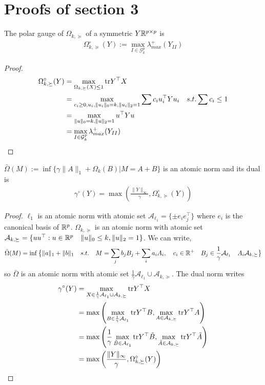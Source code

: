 \documentclass{article}
\begin{document}
\section{Proofs of section 3}

\begin{lemma} The polar gauge of $\Omega_{k,\succeq}$ of a symmetric $Y\mathbb{R}^{p\times p}$ is
\begin{align}
\Omega_{k,\succeq}^{\circ}(Y):= \max_{I\in\mathcal{G}^p_k}\lambda^{+}_{max}(Y_{II})
\end{align}
\end{lemma}

\begin{proof}
\begin{align}
\Omega_{k,\succeq}^{\circ}(Y) 
&=\max_{\Omega_{k,\succeq}(X)\leq 1} {\rm tr}{Y^{\top}X}\\
&=\max_{c_i\geq 0, u_{i}, \|u_{i}\|_0=k, \|u_{i}\|_ 2=1 } \sum c_i u_{i}^{\top}Yu_{i} \quad s.t.  \sum c_i\leq 1\\
&=\max_{\|u\|_0=k, \|u\|_ 2=1 } u^{\top}Yu \\
&=\max_{I\in\mathcal{G}^p_k}\lambda^{+}_{max}(Y_{II})
\end{align}
\end{proof}

\begin{lemma} $\bar{\Omega}(M):=\inf\{\gamma\|A\|_{1}+\Omega_k(B)|M=A+B\}$ is an atomic norm and its dual is 
\begin{align*}
\gamma^{\circ}(Y)=\max\left(\frac{\|Y\|_{\infty}}{\gamma},\Omega_{k,\succeq}^{\circ}(Y)\right)
\end{align*}
\end{lemma}

\begin{proof}
$\ell_1$ is an atomic norm with atomic set $\mathcal{A}_{\ell_{1}}=\{\pm e_i e_j^{\top}\}$ where $e_i$ is the canonical basis of $\mathbb{R}^p$. $\Omega_{k,\succeq}$  is an atomic norm with atomic set $\mathcal{A}_{k,\succeq}=\{uu^{\top}  :  u\in\mathbb{R}^{p} \quad \|u\|_0 \leq k, \|u\|_2 = 1\}$. We can write,
$$
\bar{\Omega}(M)= \inf \big\{\|a\|_1+\|b\|_1 \quad s.t. \quad M=\sum_{j} b_j B_{j} + \sum_{i} a_i A_{i}, \quad c_i\in \mathbb{R}^{+}\quad B_j\in\frac{1}{\gamma}\mathcal{A}_{\ell_{1}} \quad A_i\mathcal{A}_{k,\succeq} \big\}
$$
so $\bar{\Omega}$ is an atomic norm with atomic set $\frac{1}{\gamma}\mathcal{A}_{\ell_{1}}\cup\mathcal{A}_{k,\succeq}$. The dual norm writes
\begin{align}
\gamma^{\circ}(Y)
& = \max_{X\in\frac{1}{\gamma}\mathcal{A}_{\ell_{1}}\cup\mathcal{A}_{k,\succeq}} {\rm tr}{Y^{\top}X}\\
& =\max\left(\max_{B\in\frac{1}{\gamma}\mathcal{A}_{\ell_{1}}}{\rm tr}{Y^{\top}B}, \max_{A\in\mathcal{A}_{k,\succeq}}{\rm tr}{Y^{\top}A}\right)\\
& =\max\left(\frac{1}{\gamma}\max_{\tilde{B}\in\mathcal{A}_{\ell_{1}}}{\rm tr}{Y^{\top}\tilde{B}}, \max_{\tilde{A}\in\mathcal{A}_{k,\succeq}}{\rm tr}{Y^{\top}\tilde{A}}\right)\\
& =\max\left(\frac{\|Y\|_{\infty}}{\gamma},\Omega_{k,\succeq}^{\circ}(Y)\right)
\end{align}
%
%
\end{proof}
\end{document}

